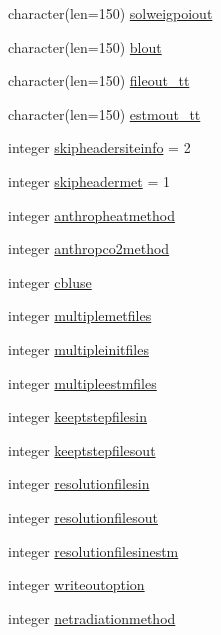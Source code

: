 \begin{DoxyCompactItemize}
\item 
character(len=150) \hyperlink{namespacedata__in_a08b0a2fffc34dcaefd3ef81483777e4e}{solweigpoiout}
\item 
character(len=150) \hyperlink{namespacedata__in_ac7dd014c6f349ee2b4c385f79348fff4}{blout}
\item 
character(len=150) \hyperlink{namespacedata__in_a0bc6e84d091c3af529338729ef26182a}{fileout\+\_\+tt}
\item 
character(len=150) \hyperlink{namespacedata__in_ab3963c227716bf7ca52ecd4fcc7a8e67}{estmout\+\_\+tt}
\item 
integer \hyperlink{namespacedata__in_a964397f0f83d198e4f674a85b7be941a}{skipheadersiteinfo} = 2
\item 
integer \hyperlink{namespacedata__in_aea829593453d36d348e367b3238f63ea}{skipheadermet} = 1
\item 
integer \hyperlink{namespacedata__in_a2d5ce0a221d7ee5c42ab2bdb3bf06a8b}{anthropheatmethod}
\item 
integer \hyperlink{namespacedata__in_a6bf8149cf01d75c9bfb8b7aa575b98c3}{anthropco2method}
\item 
integer \hyperlink{namespacedata__in_a0baf7befb79fdeb3a9b4a5107f64d25c}{cbluse}
\item 
integer \hyperlink{namespacedata__in_a1de5c53755db8632301d4d1897f3ee8f}{multiplemetfiles}
\item 
integer \hyperlink{namespacedata__in_ab28ac9ca6b8ed723ce3e74496158c5c8}{multipleinitfiles}
\item 
integer \hyperlink{namespacedata__in_ad49de355a2aafe1ffbc40d2e91a12d87}{multipleestmfiles}
\item 
integer \hyperlink{namespacedata__in_a66e75b7142f8d93aecf0a9c94a8a25d9}{keeptstepfilesin}
\item 
integer \hyperlink{namespacedata__in_ab9a0f114993684cd73bedea082abe184}{keeptstepfilesout}
\item 
integer \hyperlink{namespacedata__in_a0dfb19ee9c3d77d6a086f17b231d65b8}{resolutionfilesin}
\item 
integer \hyperlink{namespacedata__in_a6ea370f15cdb7fab545340173792072a}{resolutionfilesout}
\item 
integer \hyperlink{namespacedata__in_a1babc329d678c128938354d4c21505b9}{resolutionfilesinestm}
\item 
integer \hyperlink{namespacedata__in_a902aee6a424a884da4775e7a40782896}{writeoutoption}
\item 
integer \hyperlink{namespacedata__in_a0b433ad2361360f657c537b128e4a5f7}{netradiationmethod}

\end{DoxyCompactItemize}
